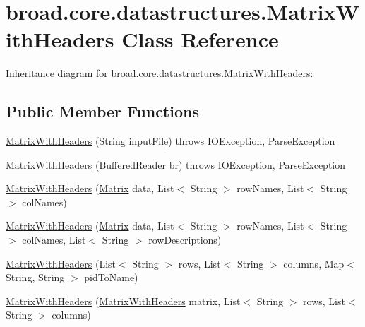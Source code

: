 \hypertarget{classbroad_1_1core_1_1datastructures_1_1_matrix_with_headers}{\section{broad.\+core.\+datastructures.\+Matrix\+With\+Headers Class Reference}
\label{classbroad_1_1core_1_1datastructures_1_1_matrix_with_headers}
}


Inheritance diagram for broad.\+core.\+datastructures.\+Matrix\+With\+Headers\+:
\subsection*{Public Member Functions}
\begin{DoxyCompactItemize}
\item 
\hyperlink{classbroad_1_1core_1_1datastructures_1_1_matrix_with_headers_a46b7fd9b72db3c4aa6620ab50be42a8a}{Matrix\+With\+Headers} (String input\+File)  throws I\+O\+Exception, Parse\+Exception 
\item 
\hyperlink{classbroad_1_1core_1_1datastructures_1_1_matrix_with_headers_a07470e5b6011b67111a824a79d97f3b1}{Matrix\+With\+Headers} (Buffered\+Reader br)  throws I\+O\+Exception, Parse\+Exception 
\item 
\hyperlink{classbroad_1_1core_1_1datastructures_1_1_matrix_with_headers_ac188a04f8627c7c2f752cee45462c6bd}{Matrix\+With\+Headers} (\hyperlink{class_jama_1_1_matrix}{Matrix} data, List$<$ String $>$ row\+Names, List$<$ String $>$ col\+Names)
\item 
\hyperlink{classbroad_1_1core_1_1datastructures_1_1_matrix_with_headers_a2ead027bfa7147b365eb1b24cd405872}{Matrix\+With\+Headers} (\hyperlink{class_jama_1_1_matrix}{Matrix} data, List$<$ String $>$ row\+Names, List$<$ String $>$ col\+Names, List$<$ String $>$ row\+Descriptions)
\item 
\hyperlink{classbroad_1_1core_1_1datastructures_1_1_matrix_with_headers_aabac05cd89fd04159705a3d2fad557cc}{Matrix\+With\+Headers} (List$<$ String $>$ rows, List$<$ String $>$ columns, Map$<$ String, String $>$ pid\+To\+Name)
\item 
\hyperlink{classbroad_1_1core_1_1datastructures_1_1_matrix_with_headers_a58c84145ca1a6c7e39c275ba6fa58229}{Matrix\+With\+Headers} (\hyperlink{classbroad_1_1core_1_1datastructures_1_1_matrix_with_headers}{Matrix\+With\+Headers} matrix, List$<$ String $>$ rows, List$<$ String $>$ columns)
\item 

\end{DoxyCompactItemize}
